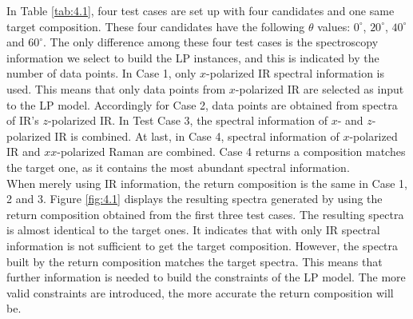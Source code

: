 \begin{table}[ht!]
\begin{center}
\end{center}
\caption{Test Case 1 and 2 for Met candidates.} 
\label{tab:4.1}
\end{table}	

In Table \ref{tab:4.1}, four test cases are set up with four candidates and one same target composition. These four candidates have the following $\theta$ values: $0^{\circ}$, $20^{\circ}$, $40^{\circ}$ and $60^{\circ}$. The only difference among these four test cases is the spectroscopy information we select to build the LP instances, and this is indicated by the number of data points. In Case 1, only $x$-polarized IR spectral information is used. This means that only data points from $x$-polarized IR are selected as input to the LP model. Accordingly for Case 2, data points are obtained from spectra of IR's $z$-polarized IR. In Test Case 3, the spectral information of $x$- and $z$-polarized IR is combined. At last, in Case 4, spectral information of $x$-polarized IR and $xx$-polarized Raman are combined. Case 4 returns a composition matches the target one, as it contains the most abundant spectral information. \\

When merely using IR information, the return composition is the same in Case 1, 2 and 3. Figure \ref{fig:4.1} displays the resulting spectra generated by using the return composition obtained from the first three test cases. The resulting spectra is almost identical to the target ones. It indicates that with only IR spectral information is not sufficient to get the target composition.  However, the spectra built by the return composition matches the target spectra. This means that further information is needed to build the constraints of the LP model. The more valid constraints are introduced, the more accurate the return composition will be. \\

